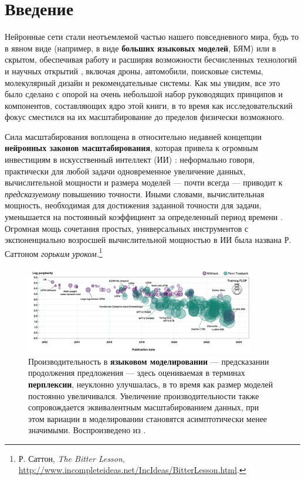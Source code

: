 \chapter{Введение}
\label{chap:introduction}

Нейронные сети стали неотъемлемой частью нашего повседневного мира, будь то в явном виде (например, в виде \textbf{больших языковых моделей}, БЯМ) или в скрытом, обеспечивая работу и расширяя возможности бесчисленных технологий и научных открытий \cite{wang2023scientific}, включая дроны, автомобили, поисковые системы, молекулярный дизайн и рекомендательные системы. Как мы увидим, все это было сделано с опорой на очень небольшой набор руководящих принципов и компонентов, составляющих ядро этой книги, в то время как исследовательский фокус сместился на их масштабирование до пределов физически возможного.

Сила масштабирования воплощена в относительно недавней концепции \textbf{нейронных законов масштабирования}, которая привела к огромным инвестициям в искусственный интеллект (ИИ) \cite{kaplan2020scaling,ho2024algorithmic}: неформально говоря, практически для любой задачи одновременное увеличение данных, вычислительной мощности и размера моделей — почти всегда — приводит к \textit{предсказуемому} повышению точности. Иными словами, вычислительная мощность, необходимая для достижения заданной точности для задачи, уменьшается на постоянный коэффициент за определенный период времени \cite{ho2024algorithmic}. Огромная мощь сочетания простых, универсальных инструментов с экспоненциально возросшей вычислительной мощностью в ИИ была названа Р. Саттоном \textit{горьким уроком}.\footnote{Р. Саттон, \textit{The Bitter Lesson}, \url{http://www.incompleteideas.net/IncIdeas/BitterLesson.html}.}

\begin{figure}
    \centering
    \includegraphics[width=0.9\textwidth]{images/compute_scaling.png}
    \caption{Производительность в \textbf{языковом моделировании} — предсказании продолжения предложения — здесь оцениваемая в терминах \textbf{перплексии}, неуклонно улучшалась, в то время как размер моделей постоянно увеличивался. Увеличение производительности также сопровождается эквивалентным масштабированием данных, при этом вариации в моделировании становятся асимптотически менее значимыми. Воспроизведено из \cite{ho2024algorithmic}.}
    \label{fig:compute_scaling}
\end{figure}

